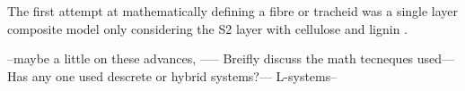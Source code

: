  The first attempt at mathematically defining a fibre or tracheid was a single layer composite model only considering the S2 layer with cellulose and lignin \cite{Barber_1964}. 
 
 
 --maybe a little on these advances, ----- Breifly discuss the math
tecneques used---Has any one used descrete or hybrid systems?--- L-systems--